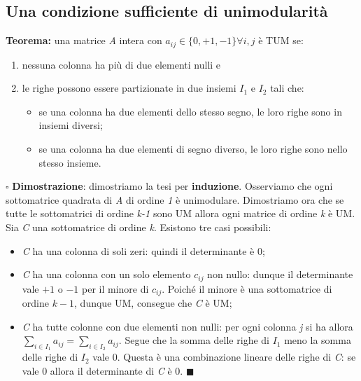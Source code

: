 \documentclass[11pt]{book}
\begin{document}
\subsection{Una condizione sufficiente di unimodularit\`a}

{\bf Teorema:} una matrice {\em A} intera con $a_{ij} \in \{0, +1,
-1\} \forall i,j$ \`e TUM se:

\begin{enumerate}
\item nessuna colonna ha pi\`u di due elementi nulli e
\item le righe possono essere partizionate in due insiemi $I_1$ e
  $I_2$ tali che:

  \begin{itemize}
  \item se una colonna ha due elementi dello stesso segno, le loro
    righe sono in insiemi diversi;
  \item se una colonna ha due elementi di segno diverso, le loro righe
    sono nello stesso insieme.
  \end{itemize}

\end{enumerate}

\vspace{11pt}
$\square$ {\bf Dimostrazione}: dimostriamo la tesi per {\bf
  induzione}. Osserviamo che ogni sottomatrice quadrata di {\em A} di
ordine {\em 1} \`e unimodulare. Dimostriamo ora che se tutte le
sottomatrici di ordine {\em k-1} sono UM allora ogni matrice di ordine
{\em k} \`e UM. Sia {\em C} una sottomatrice di ordine {\em
  k}. Esistono tre casi possibili:

\begin{itemize}
\item {\em C} ha una colonna di soli zeri: quindi il determinante \`e
  0;
\item {\em C} ha una colonna con un solo elemento $c_{ij}$ non nullo:
  dunque il determinante vale $+1$ o $-1$ per il minore di
  $c_{ij}$. Poich\'e il minore \`e una sottomatrice di ordine $k-1$,
  dunque UM, consegue che {\em C} \`e UM;
\item {\em C} ha tutte colonne con due elementi non nulli: per ogni
  colonna {\em j} si ha allora $\sum_{i\in I_1} a_{ij} = \sum_{i\in
    I_2} a_{ij}$. Segue che la somma delle righe di $I_1$ meno la
  somma delle righe di $I_2$ vale 0. Questa \`e una combinazione
  lineare delle righe di {\em C}: se vale 0 allora il determinante di
  {\em C} \`e 0. $\blacksquare$
\end{itemize}
\vspace{11pt}
\end{document}
